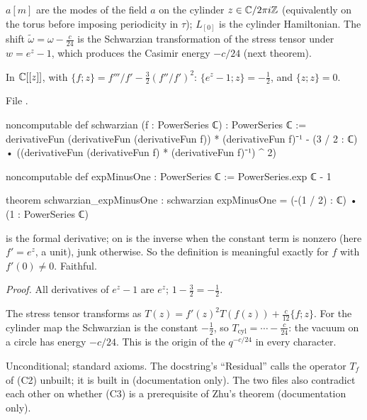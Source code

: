\begin{physics}
$a[m]$ are the modes of the field $a$ on the cylinder $z\in{\mathbb{C}}/2\pi i{\mathbb{Z}}$ (equivalently on the torus before imposing periodicity
in $\tau$); $L_{[0]}$ is the cylinder Hamiltonian. The shift $\tilde\omega = \omega - \frac c{24}$ is the Schwarzian
transformation of the stress tensor under $w = e^z - 1$, which produces the Casimir energy $-c/24$ (next theorem).
\end{physics}

\begin{theorem}\label{l14:thm:schwarzian}
In ${\mathbb{C}}[[z]]$, with $\{f;z\} = f'''/f' - \frac32(f''/f')^2$: $\{e^z-1;z\} = -\frac12$, and $\{z;z\} = 0$.
\end{theorem}
\noindent File .
\begin{leancode}
noncomputable def schwarzian (f : PowerSeries ℂ) : PowerSeries ℂ :=
  derivativeFun (derivativeFun (derivativeFun f)) * (derivativeFun f)⁻¹
    - (3 / 2 : ℂ) • ((derivativeFun (derivativeFun f) * (derivativeFun f)⁻¹) ^ 2)

noncomputable def expMinusOne : PowerSeries ℂ := PowerSeries.exp ℂ - 1

theorem schwarzian_expMinusOne :
    schwarzian expMinusOne = (-(1 / 2) : ℂ) • (1 : PowerSeries ℂ)
\end{leancode}
\begin{dictionary}
 is the formal derivative;  on  is the inverse when the constant term is
nonzero (here $f' = e^z$, a unit), junk otherwise. So the definition is meaningful exactly for $f$ with $f'(0)\neq0$.
Faithful.
\end{dictionary}
\noindent\emph{Proof.} All derivatives of $e^z-1$ are $e^z$; $1 - \frac32 = -\frac12$.
\begin{physics}
The stress tensor transforms as $T(z) = f'(z)^2T(f(z)) + \frac{c}{12}\{f;z\}$. For the cylinder map the Schwarzian is the
constant $-\frac12$, so $T_{\text{cyl}} = \cdots - \frac c{24}$: the vacuum on a circle has energy $-c/24$. This is the origin
of the $q^{-c/24}$ in every character.
\end{physics}
\begin{status}
Unconditional; standard axioms. The docstring's ``Residual'' calls the operator $T_f$ of (C2) unbuilt; it is built in
 (documentation only). The two files also contradict each other on whether (C3) is a prerequisite of Zhu's theorem
(documentation only).
\end{status}

